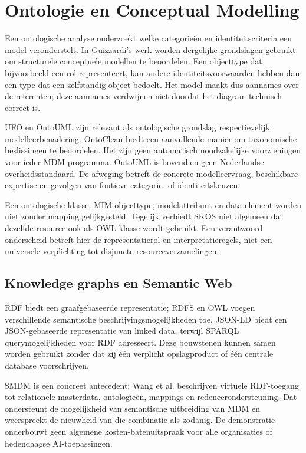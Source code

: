 \section{Ontologie en Conceptual Modelling}
Een ontologische analyse onderzoekt welke categorieën en identiteitscriteria een model veronderstelt. In Guizzardi's werk worden dergelijke grondslagen gebruikt om structurele conceptuele modellen te beoordelen. Een objecttype dat bijvoorbeeld een rol representeert, kan andere identiteitsvoorwaarden hebben dan een type dat een zelfstandig object bedoelt. Het model maakt dus aannames over de referenten; deze aannames verdwijnen niet doordat het diagram technisch correct is. \parencite{L08}

UFO en OntoUML zijn relevant als ontologische grondslag respectievelijk modelleer\-benadering. OntoClean biedt een aanvullende manier om taxonomische beslissingen te beoordelen. Het zijn geen automatisch noodzakelijke voorzieningen voor ieder MDM-programma. OntoUML is bovendien geen Nederlandse overheidsstandaard. De afweging betreft de concrete modelleervraag, beschikbare expertise en gevolgen van foutieve categorie- of identiteitskeuzen. \parencite{S40,S41,L10}

Een ontologische klasse, MIM-objecttype, modelattribuut en data-element worden niet zonder mapping gelijkgesteld. Tegelijk verbiedt SKOS niet algemeen dat dezelfde resource ook als OWL-klasse wordt gebruikt. Een verantwoord onderscheid betreft hier de representatierol en interpretatieregels, niet een universele verplichting tot disjuncte resourceverzamelingen. \parencite[§3.5.1]{S31}\parencite{S13,S08}

\subsection{Knowledge graphs en Semantic Web}
RDF biedt een graafgebaseerde representatie; RDFS en OWL voegen verschillende semantische beschrijvingsmogelijkheden toe. JSON-LD biedt een JSON-gebaseerde representatie van linked data, terwijl SPARQL querymogelijkheden voor RDF adresseert. Deze bouwstenen kunnen samen worden gebruikt zonder dat zij één verplicht opslagproduct of één centrale database voorschrijven. \parencite{S28,S29,S30,S35,S36}

SMDM is een concreet antecedent: Wang et al. beschrijven virtuele RDF-toegang tot relationele masterdata, ontologieën, mappings en redeneerondersteuning. Dat ondersteunt de mogelijkheid van semantische uitbreiding van MDM en weerspreekt de nieuwheid van die combinatie als zodanig. De demonstratie onderbouwt geen algemene kosten-batenuitspraak voor alle organisaties of hedendaagse AI-toepassingen. \parencite{L18}

